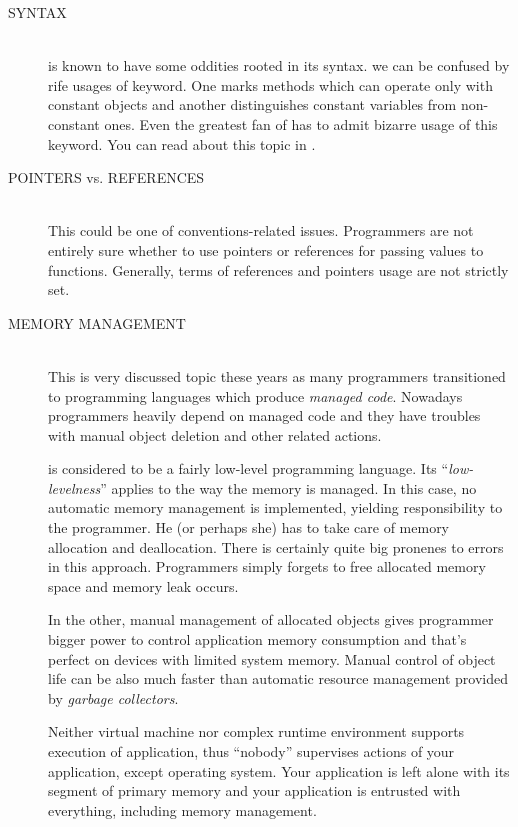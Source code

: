 \begin{description}
\item[SYNTAX\ts{\textcolor{red}{bad}}]\hfill \\
\cpp is known to have some oddities rooted in its syntax. \Eg we can be confused by rife usages of keyword. One marks methods which can operate only with constant objects and another distinguishes constant variables from non-constant ones. Even the greatest fan of \cpp has to admit bizarre usage of this keyword. You can read about this topic in \citep[p.~90-92, p.~537]{prata:cprimer}.

\item[POINTERS vs. REFERENCES\ts{\textcolor{red}{bad}}]\hfill \\
This could be one of conventions-related issues. Programmers are not entirely sure whether to use pointers or references for passing values to functions. Generally, terms of references and pointers usage are not strictly set.

\item[MEMORY MANAGEMENT\ts{\textcolor{red}{bad}, \textcolor{ultragreen}{good}}]\hfill \\
This is very discussed topic these years as many programmers transitioned to programming languages which produce
\emph{managed code}. Nowadays programmers heavily depend on managed code and they have troubles with manual
object deletion and other related actions.

\cpp is considered to be a fairly low-level programming language. Its \enquote{\textit{low-levelness}} applies to the way the memory is managed. In this case, no automatic memory management is implemented, yielding responsibility to the programmer. He (or perhaps she) has to take care of memory allocation and deallocation. There is certainly quite big pronenes to errors in this approach. Programmers simply forgets to free allocated memory space and memory leak occurs.

In the other, manual management of allocated objects gives programmer bigger power to control application memory consumption and that's perfect on devices with limited system memory. Manual control of object life can be also much faster than automatic resource management provided by \textit{garbage collectors}.

Neither virtual machine nor complex runtime environment supports execution of \cpp application, thus \enquote{nobody} supervises actions of your application, except operating system. Your application is left alone with its segment of primary memory and your application is entrusted with everything, including memory management.


\end{description}
